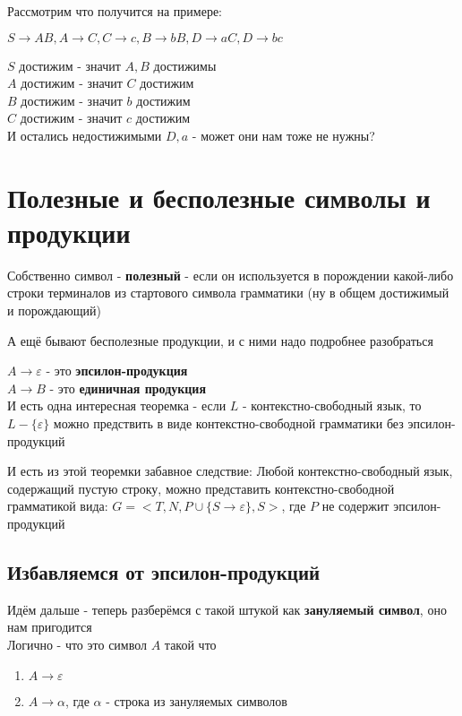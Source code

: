 \documentclass{article}
\begin{document}
Рассмотрим что получится на примере:

$ S \to AB, A \to C, C \to c, B \to bB, D \to aC, D \to bc$

$S$ достижим - значит $A, B$ достижимы\\
$A$ достижим - значит $C$ достижим\\
$B$ достижим - значит $b$ достижим\\
$C$ достижим - значит $c$ достижим\\

И остались недостижимыми $D, a$ - может они нам тоже не нужны?




\section{Полезные и бесполезные символы и продукции}
Собственно символ - \textbf{полезный} - если он используется в порождении какой-либо строки терминалов из стартового символа грамматики (ну в общем достижимый и порождающий)

А ещё бывают бесполезные продукции, и с ними надо подробнее разобраться

$A \to \varepsilon$ - это \textbf{эпсилон-продукция}\\
$A \to B$ - это \textbf{единичная продукция}\\

И есть одна интересная теоремка - если $L$ - контекстно-свободный язык, то $L - \{\varepsilon\}$ можно предствить в виде контекстно-свободной грамматики без эпсилон-продукций 

И есть из этой теоремки забавное следствие: Любой контекстно-свободный язык, содержащий пустую строку, можно представить контекстно-свободной грамматикой вида: 
$ G = <T, N, P \cup \{S\to \varepsilon \}, S>$, где $P$ не содержит эпсилон-продукций

\subsection{Избавляемся от эпсилон-продукций}
Идём дальше - теперь разберёмся с такой штукой как \textbf{зануляемый символ}, оно нам пригодится\\
Логично - что это символ $A$ такой что 
\begin{enumerate}
  \item $A \to \varepsilon$
    \item $A \to \alpha$, где $\alpha$ - строка из зануляемых символов
\end{enumerate}
\end{document}
